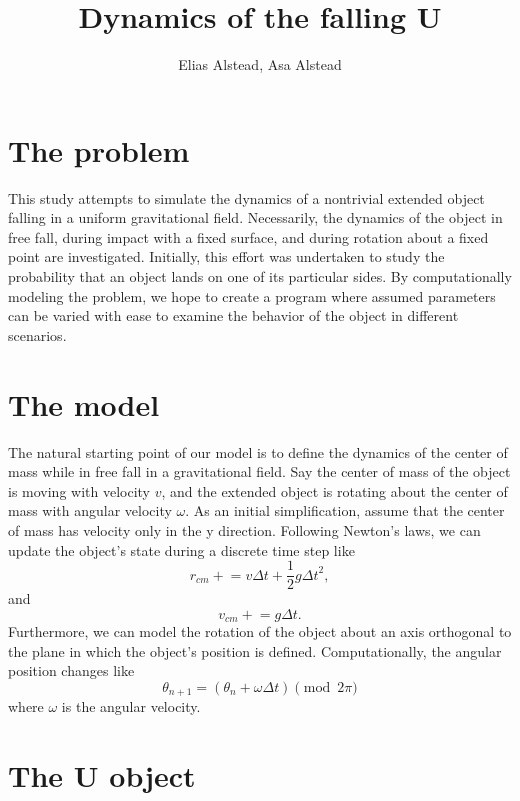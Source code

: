 \documentclass{article}
\title{Dynamics of the falling U}
\author{Elias Alstead, Asa Alstead}
\begin{document}
\maketitle

\section{The problem}
\setcounter{equation}{0}

This study attempts to simulate the dynamics of a nontrivial extended object falling in a uniform gravitational field. Necessarily, the dynamics of the object in free fall, during impact with a fixed surface, and during rotation about a fixed point are investigated. Initially, this effort was undertaken to study the probability that an object lands on one of its particular sides. By computationally modeling the problem, we hope to create a program where assumed parameters can be varied with ease to examine the behavior of the object in different scenarios.

\section{The model}
\setcounter{equation}{0}

The natural starting point of our model is to define the dynamics of the center of mass while in free fall in a gravitational field. Say the center of mass of the object is moving with velocity $v$, and the extended object is rotating about the center of mass with angular velocity $\omega$. As an initial simplification, assume that the center of mass has velocity only in the y direction. Following Newton's laws, we can update the object's state during a discrete time step like
\begin{equation}
  r_{cm} \mathrel{+}= v \Delta t + \frac{1}{2} g {\Delta t}^2,
\end{equation}
and
\begin{equation}
    v_{cm} \mathrel{+}= g \Delta t.
\end{equation}
Furthermore, we can model the rotation of the object about an axis orthogonal to the plane in which the object's position is defined. Computationally, the angular position changes like
\begin{equation}
    \theta_{n + 1} = (\theta_{n} + \omega \Delta t) \pmod{2 \pi}
\end{equation}
where $\omega$ is the angular velocity.

\section{The U object}
\setcounter{equation}{0}
\end{document}
